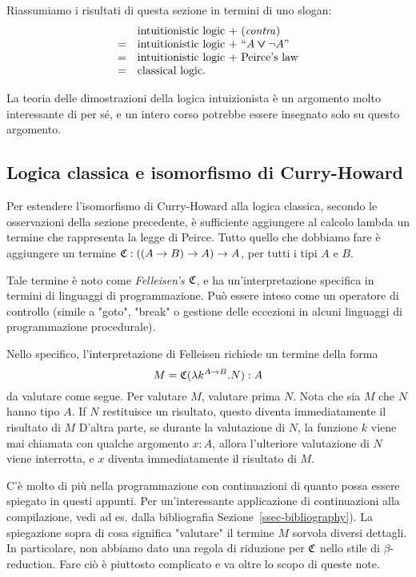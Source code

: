 \documentclass{article}
\begin{document}
 

Riassumiamo i risultati di
questa sezione in termini di uno slogan:
\[ \begin{array}{ll}
  &  \mbox{intuitionistic logic + \textrm{(\textit{contra\/})}} \\
  =& \mbox{intuitionistic logic + ``$A\mathbin{\textrm{\rm\boldmath $\vee$}}\neg A$''} \\
  =& \mbox{intuitionistic logic + Peirce's law} \\
  =& \mbox{classical logic.}
\end{array}
\]

La teoria delle dimostrazioni della logica intuizionista \`e un argomento molto interessante
di per sé, e un intero corso potrebbe essere insegnato solo su questo
argomento.

\subsection{Logica classica e isomorfismo di Curry-Howard}

Per estendere l'isomorfismo di Curry-Howard alla logica classica, secondo le 
osservazioni della sezione precedente, \`e sufficiente aggiungere
al calcolo lambda un termine che rappresenta la legge di Peirce. Tutto
 quello che dobbiamo fare \`e aggiungere un termine $\mathfrak{C}:((A\to B)\to A)\to A$, per tutti i tipi $A$
e $B$. 

Tale termine \`e noto come {\em Felleisen's $\mathfrak{C}$}, e ha un'interpretazione
 specifica in termini di linguaggi di programmazione. Pu\`o essere inteso come
 un operatore di controllo (simile a "goto", "break" o gestione delle eccezioni in alcuni linguaggi di programmazione procedurale).

Nello specifico, l'interpretazione di Felleisen richiede un termine della forma
\[ M = \mathfrak{C}(\lambda k^{A\to B}.N) : A
\]
da valutare come segue. Per valutare $M$, valutare prima $N$.  Nota
che sia $M$ che $N$ hanno tipo $A$. If $N$ restituisce un risultato, 
questo diventa immediatamente il risultato di $M$ D'altra parte, se durante la valutazione di 
 $N$, la funzione $k$ viene mai chiamata con qualche argomento
 $x:A$, allora l'ulteriore valutazione di $N$ viene interrotta,
e $x$ diventa immediatamente il risultato di $M$.

C'\`e molto di più nella programmazione con continuazioni di quanto possa essere spiegato 
in questi appunti. Per un'interessante applicazione di continuazioni alla compilazione, vedi 
ad es. {\cite{App92}} dalla  bibliografia Sezione~\ref{ssec-bibliography}). La spiegazione 
sopra di cosa significa "valutare" il termine $M$ sorvola diversi dettagli. In particolare, non 
abbiamo dato una regola di riduzione per $\mathfrak{C}$ nello stile di $\beta$-reduction. Fare ci\`o \`e 
piuttosto complicato e va oltre lo scopo di queste note.
\end{document}
